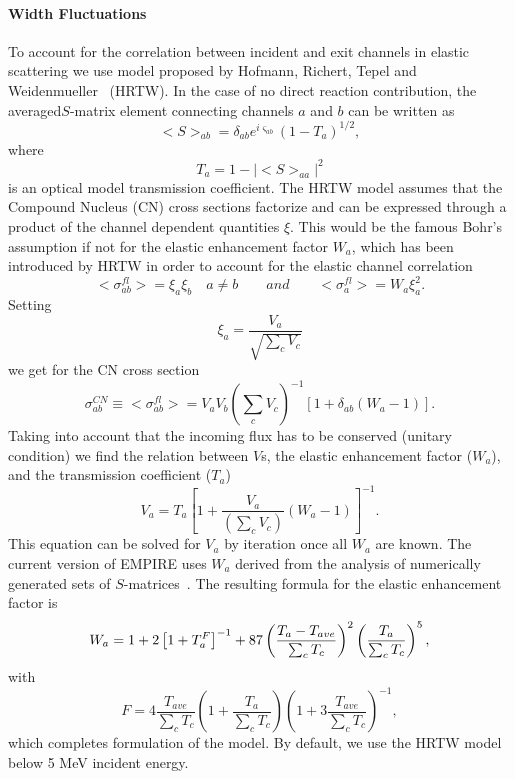 \paragraph{Width Fluctuations}

To account for the correlation between incident and exit channels in elastic
scattering we use model proposed by Hofmann, Richert, Tepel and
Weidenmueller~\cite{HRTW} (HRTW). In the case of no direct reaction
contribution, the averaged$S$-matrix element connecting channels $a$ and $b$
can be written as 
\begin{equation}
<S>_{ab}=\delta_{ab}e^{i\varsigma_{ab}}(1-T_{a})^{1/2},  \label{Sab}
\end{equation}
\noindent where 
\begin{equation}
T_{a}=1-|<S>_{aa}|^{2}  \label{Ta}
\end{equation}
is an optical model transmission coefficient. The HRTW model assumes that
the Compound Nucleus (CN) cross sections factorize and can be expressed
through a product of the channel dependent quantities $\xi$. This would be
the famous Bohr's assumption if not for the elastic enhancement factor $%
W_{a} $, which has been introduced by HRTW in order to account for the
elastic channel correlation 
\begin{equation}
<\sigma_{ab}^{fl}>=\xi_{a}\xi_{b}\quad a\neq b\qquad
and\qquad<\sigma_{a}^{fl}>=W_{a}\xi_{a}^{2}.  \label{Sig-fluc}
\end{equation}
Setting 
\begin{equation}
\xi_{a}=%
\frac{V_{a}}{\sqrt{\sum_{c}V_{c}}}  \label{ksi}
\end{equation}
we get for the CN cross section 
\begin{equation}
\sigma_{ab}^{CN}\equiv<\sigma_{ab}^{fl}>=V_{a}V_{b}\left(\sum_{c}V_{c}%
\right)^{-1}\left[1+\delta_{ab}\left(W_{a}-1\right)\right].
\label{Sig-flucV}
\end{equation}
Taking into account that the incoming flux has to be conserved (unitary
condition) we find the relation between $V$s, the elastic enhancement factor
($W_{a}$), and the transmission coefficient ($T_{a}$) 
\begin{equation}
V_{a}=T_{a}\left[1+\frac{V_{a}}{\left(\sum_{c}V_{c}\right)}%
\left(W_{a}-1\right)\right]^{-1}.  \label{Va}
\end{equation}
This equation can be solved for $V_{a}$ by iteration once all $W_{a}$ are
known. The current version of EMPIRE uses $W_{a}$ derived from the analysis
of numerically generated sets of $S$-matrices~\cite{HHM}. The resulting
formula for the elastic enhancement factor is 
\begin{equation}
W_{a}=1+2\left[1+T_{a}^{F}\right]^{-1}+87\left(\frac{T_{a}-T_{ave}}{%
\sum_{c}T_{c}}\right)^{2}\left(\frac{T_{a}}{\sum_{c}T_{c}}\right)^{5},
\label{Wa}
\end{equation}
with 
\begin{equation}
F=4\frac{T_{ave}}{\sum_{c}T_{c}}\left(1+\frac{T_{a}}{\sum_{c}T_{c}}%
\right)\left(1+3\frac{T_{ave}}{\sum_{c}T_{c}}\right)^{-1},  \label{Wa-F}
\end{equation}
which completes formulation of the model. By default, we use the HRTW model
below 5 MeV incident energy.

